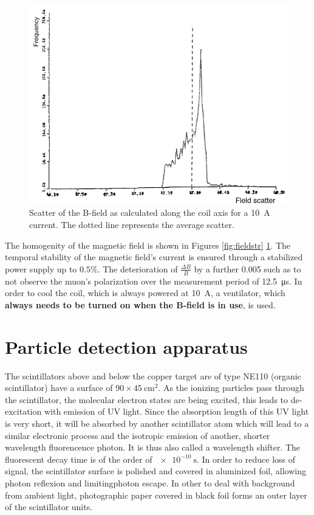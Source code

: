 \begin{figure}
\centering
 \includegraphics[width=\linewidth]{./fig/fieldscat.png}
\caption{Scatter of the B-field as calculated along the coil axis for a \SI{10}{\ampere} current. The dotted line represents the average scatter.}
\label{fig:fieldscat}
\end{figure}

The homogenity of the magnetic field is shown in Figures \ref{fig:fieldstr} \ref{fig:fieldscat}.
The temporal stability of the magnetic field's current is ensured through a stabilized power supply up to $0.5 \%$. The deterioration of $\frac{\Delta B}{B}$  by a further 0.005 such as to not observe the muon's polarization over the measurement period of \SI{12.5}{\micro\second}. In order to cool the coil, which is always powered at \SI{10}{\ampere}, a ventilator, which \textbf{always needs to be turned on when the B-field is in use}, is used.

\section{Particle detection apparatus}

The scintillators above and below the copper target are of type NE110 (organic scintillator) have a surface of $90 \times \SI{45}{\centi\meter\squared}$. As the ionizing particles pass through the scintillator, the molecular electron states are being excited, this leads to de-excitation with emission of UV light. Since the absorption length of this UV light is very short, it will be absorbed by another scintillator atom which will lead to a similar electronic process and the isotropic emission of another, shorter wavelength fluorencence photon. It is thus also called a wavelength shifter. The fluorescent decay time is of the order of $\SI{e-10}{\second}$. In order to reduce loss of signal, the scintillator surface is polished and covered in aluminized foil, allowing photon reflexion and limitingphoton escape. In other to deal with background from ambient light, photographic paper covered in black foil forms an outer layer of the scintillator units.

